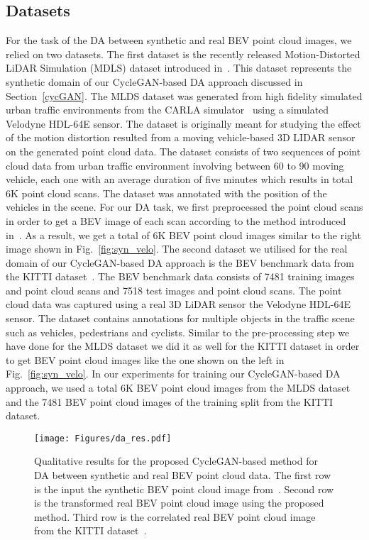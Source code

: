\documentclass[letterpaper, 10 pt, conference]{IEEEtran}
\begin{document}
\subsection{Datasets}
For the task of the DA between synthetic and real BEV point cloud images, we relied on two datasets. The first dataset is the recently released Motion-Distorted LiDAR Simulation (MDLS) dataset introduced in~\cite{yoon2018mapless}. This dataset represents the synthetic domain  of our CycleGAN-based DA approach discussed in Section~\ref{cycGAN}. The MLDS dataset was generated from high fidelity simulated urban traffic environments from the CARLA simulator~\cite{Dosovitskiy17} using a simulated Velodyne HDL-64E sensor. The dataset is originally meant for studying the effect of the motion distortion resulted from a moving vehicle-based 3D LIDAR sensor on the generated point cloud data. The dataset consists of two sequences of point cloud data from urban traffic environment involving between 60 to 90 moving vehicle, each one with an average duration of five minutes which results in total 6K point cloud scans. The dataset was annotated with the position of the vehicles in the scene. For our DA task, we first preprocessed the point cloud scans in order to get a BEV image of each scan according to the method introduced in~\cite{li20173d}. As a result, we get a total of 6K BEV point cloud images similar to the right image shown in Fig.~\ref{fig:syn_velo}. The second dataset we utilised for the real domain  of our CycleGAN-based DA approach is the BEV benchmark data from the KITTI dataset~\cite{Geiger2012CVPR}. The BEV benchmark data consists of 7481 training images and point cloud scans and 7518 test images and point cloud scans. The point cloud data was captured using a real 3D LiDAR sensor the Velodyne HDL-64E sensor. The dataset contains annotations for multiple objects in the traffic scene such as vehicles, pedestrians and cyclists. Similar to the pre-processing step we have done for the MLDS dataset we did it as well for the KITTI dataset in order to get BEV point cloud images like the one shown on the left in Fig.~\ref{fig:syn_velo}. In our experiments for training our CycleGAN-based DA approach, we used a total 6K BEV point cloud images from the MLDS dataset and the 7481 BEV point cloud images of the training split from the KITTI dataset.
 \begin{figure}[t]
 \centering
	\texttt{[image: Figures/da\_res.pdf]}
		\caption{Qualitative results for the proposed CycleGAN-based method for DA between synthetic and real BEV point cloud data. The first row is the input the synthetic BEV point cloud image from~\cite{yoon2018mapless}. Second row is the transformed real BEV point cloud image using the proposed method. Third row is the correlated real BEV point cloud image from the KITTI dataset~\cite{Geiger2012CVPR}.} 
	\label{fig:da_velo}
\end{figure}
\end{document}
